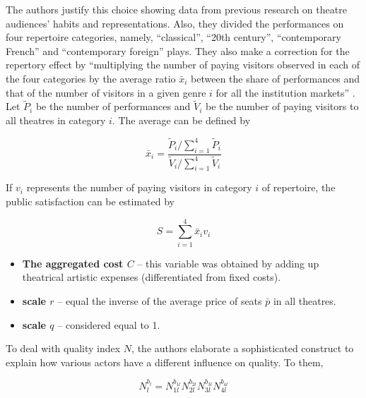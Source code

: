 \documentclass[a4paper, 12pt, openright, oneside, german, french, brazil, english]{abntex2}
\begin{document}
	The authors justify this choice showing data from previous research on theatre audiences' habits and representations. Also, they divided the performances on four repertoire categories, namely, ``classical'', ``20th century'', ``contemporary French'' and ``contemporary foreign'' plays. They also make a correction for the repertory effect by ``multiplying the number of paying visitors observed  in each of the four categories by the average ratio $\bar{x}_i$ between the share of performances and that of the number of visitors in a given genre $i$ for all the institution markets'' \cite[p. 265]{biencourt2002market}. Let $\tilde{P}_i$ be the number of performances and $\tilde{V}_i$ be the number of paying visitors to all theatres in category $i$. The average can be defined by
	
	\begin{equation}
	\label{repertory-effect-correction}
		\bar{x}_i = \frac{\tilde{P}_i / \sum_{i=1}^{4}\tilde{P}_i}{\tilde{V}_i / \sum_{i=1}^{4}\tilde{V}_i}	
	\end{equation}
	
	If $v_i$ represents the number of paying visitors in category $i$ of repertoire, the public satisfaction can be estimated by
	
	\begin{equation}
	\label{satisfaction-corrected}
		S = \sum_{i=1}^{4}\bar{x}_i v_i
	\end{equation}
	
	
	
	\begin{itemize}
		\item \textbf{The aggregated cost $C$} -- this variable was obtained by adding up theatrical artistic expenses (differentiated from fixed costs).
		
		\item \textbf{scale $r$} -- equal the inverse of the average price of seats $\bar{p}$ in all theatres.
		
		\item \textbf{scale $q$} -- considered equal to 1.
	\end{itemize}

	To deal with quality index $N$, the authors elaborate a sophisticated construct to explain how various actors have a different influence on quality. To them,
	
	\begin{equation}
	\label{biencourt-quality}
		N_{l}^{b_l} = N_{1l}^{b_{1l}} N_{2l}^{b_{2l}} N_{3l}^{b_{3l}} N_{4l}^{b_{4l}} 
	\end{equation}
	
\end{document}
